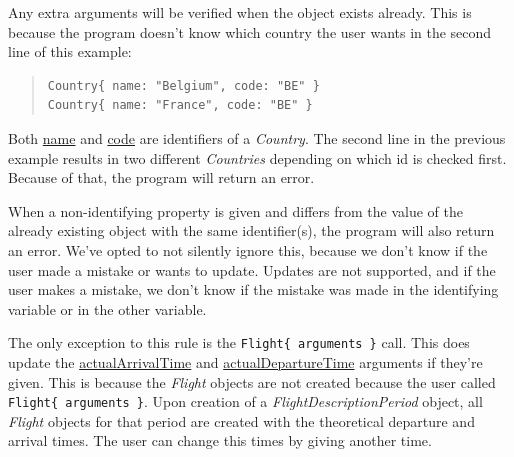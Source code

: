 \documentclass[a4paper,11pt]{article}
\newcommand{\spar}{\par \noindent}
\newcommand{\dslcode}[1]{\texttt{#1}}
\newcommand{\dsltype}[1]{\textit{#1}}
\newcommand{\dslattr}[1]{\uline{#1}}
\begin{document}
\spar Any extra arguments will be verified when the object exists already. This is because the program doesn't know which country the user wants in the second line of this example:
\begin{quote}\begin{verbatim}
Country{ name: "Belgium", code: "BE" }
Country{ name: "France", code: "BE" }
\end{verbatim}\end{quote}

Both \dslattr{name} and \dslattr{code} are identifiers of a \dsltype{Country}. The second line in the previous example results in two different \dsltype{Countries} depending on which id is checked first. Because of that, the program will return an error.

\par When a non-identifying property is given and differs from the value of the already existing object with the same identifier(s), the program will also return an error. We've opted to not silently ignore this, because we don't know if the user made a mistake or wants to update. Updates are not supported, and if the user makes a mistake, we don't know if the mistake was made in the identifying variable or in the other variable.
\par The only exception to this rule is the \dslcode{Flight\{ arguments \}} call. This does update the \dslattr{actualArrivalTime} and \dslattr{actualDepartureTime} arguments if they're given. This is because the \dsltype{Flight} objects are not created because the user called \dslcode{Flight\{ arguments \}}. Upon creation of a \dsltype{FlightDescriptionPeriod} object, all \dsltype{Flight} objects for that period are created with the theoretical departure and arrival times. The user can change this times by giving another time.
\end{document}

